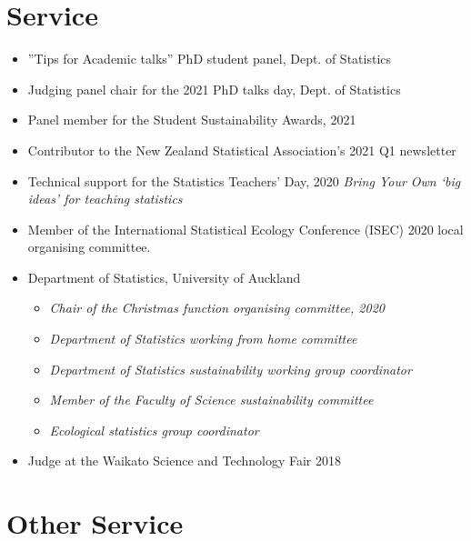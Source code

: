 \documentclass[10pt,a4paper]{moderncv}
\begin{document}
\section{Service}
\vspace{6pt}

\begin{itemize}
  \item ''Tips for Academic talks'' PhD student panel, Dept. of Statistics
  \item Judging panel chair for the 2021 PhD talks day, Dept. of Statistics
  \item Panel member for the Student Sustainability Awards, 2021
  \item Contributor to the New Zealand Statistical Association's 2021 Q1 newsletter
  \item Technical support for the Statistics Teachers' Day, 2020 \textit{Bring Your Own `big ideas' for teaching statistics}
\item Member of the International Statistical Ecology Conference (ISEC) 2020 local organising committee.
\item Department of Statistics, University of Auckland
  \begin{itemize}
  \item \textit{Chair of the Christmas function organising committee, 2020}
  \item \textit{Department of Statistics working from home committee}
  \item \textit{Department of Statistics sustainability working group coordinator}
  \item \textit{Member of the Faculty of Science sustainability committee}
  \item \textit{Ecological statistics group coordinator}
  \end{itemize}
\item Judge at the Waikato Science and Technology Fair 2018
\end{itemize}



\section{Other Service}

\vspace{6pt}
\end{document}
